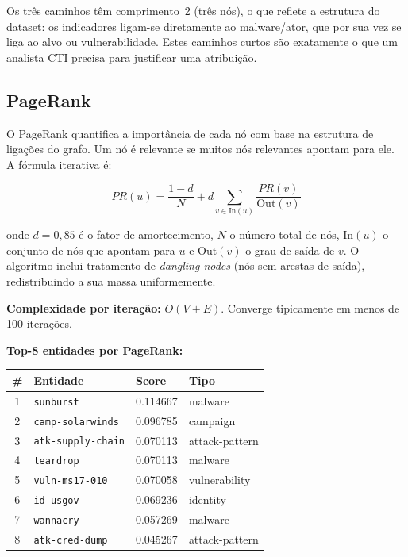 \documentclass[12pt,a4paper]{article}
\begin{document}
\medskip
Os três caminhos têm comprimento~2 (três nós), o que reflete a estrutura do dataset: os indicadores ligam-se diretamente ao malware/ator, que por sua vez se liga ao alvo ou vulnerabilidade. Estes caminhos curtos são exatamente o que um analista CTI precisa para justificar uma atribuição.

\subsection{PageRank}

O PageRank quantifica a importância de cada nó com base na estrutura de ligações do grafo. Um nó é relevante se muitos nós relevantes apontam para ele. A fórmula iterativa é:

\[
  PR(u) = \frac{1-d}{N} + d \sum_{v \in \text{In}(u)} \frac{PR(v)}{\text{Out}(v)}
\]

onde $d = 0{,}85$ é o fator de amortecimento, $N$ o número total de nós, $\text{In}(u)$ o conjunto de nós que apontam para $u$ e $\text{Out}(v)$ o grau de saída de $v$. O algoritmo inclui tratamento de \emph{dangling nodes} (nós sem arestas de saída), redistribuindo a sua massa uniformemente.

\medskip
\noindent\textbf{Complexidade por iteração:} $O(V + E)$. Converge tipicamente em menos de 100 iterações.

\medskip
\noindent\textbf{Top-8 entidades por PageRank:}

\begin{center}
\begin{tabular}{clll}
\toprule
\textbf{\#} & \textbf{Entidade} & \textbf{Score} & \textbf{Tipo} \\
\midrule
1 & \texttt{sunburst}         & 0.114667 & malware \\
2 & \texttt{camp-solarwinds}  & 0.096785 & campaign \\
3 & \texttt{atk-supply-chain} & 0.070113 & attack-pattern \\
4 & \texttt{teardrop}         & 0.070113 & malware \\
5 & \texttt{vuln-ms17-010}    & 0.070058 & vulnerability \\
6 & \texttt{id-usgov}         & 0.069236 & identity \\
7 & \texttt{wannacry}         & 0.057269 & malware \\
8 & \texttt{atk-cred-dump}    & 0.045267 & attack-pattern \\
\bottomrule
\end{tabular}
\end{center}
\end{document}
